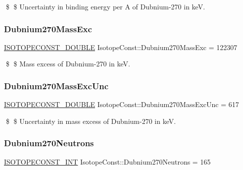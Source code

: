 \$ \$ Uncertainty in binding energy per A of Dubnium-\/270 in keV. \mbox{\label{group___isotope_const-_dubnium-_db270_gae0d63cac9554bf97ac8a30cd10a96adf}} 
\subsubsection{\texorpdfstring{Dubnium270\+Mass\+Exc}{Dubnium270MassExc}}
{\footnotesize\ttfamily \mbox{\hyperlink{group___isotope_const-_macros_ga8f45a7272ce02c0b4c65c44636ed719a}{I\+S\+O\+T\+O\+P\+E\+C\+O\+N\+S\+T\+\_\+\+D\+O\+U\+B\+LE}} Isotope\+Const\+::\+Dubnium270\+Mass\+Exc = 122307}

\$ \$ Mass excess of Dubnium-\/270 in keV. \mbox{\label{group___isotope_const-_dubnium-_db270_ga33030844d8b7a857f79835004a226f11}} 
\subsubsection{\texorpdfstring{Dubnium270\+Mass\+Exc\+Unc}{Dubnium270MassExcUnc}}
{\footnotesize\ttfamily \mbox{\hyperlink{group___isotope_const-_macros_ga8f45a7272ce02c0b4c65c44636ed719a}{I\+S\+O\+T\+O\+P\+E\+C\+O\+N\+S\+T\+\_\+\+D\+O\+U\+B\+LE}} Isotope\+Const\+::\+Dubnium270\+Mass\+Exc\+Unc = 617}

\$ \$ Uncertainty in mass excess of Dubnium-\/270 in keV. \mbox{\label{group___isotope_const-_dubnium-_db270_gacf3bfa02f058b3a459cc2c9e994ee283}} 
\subsubsection{\texorpdfstring{Dubnium270\+Neutrons}{Dubnium270Neutrons}}
{\footnotesize\ttfamily \mbox{\hyperlink{group___isotope_const-_macros_ga5f18360b3e99483a35c32d789e62621c}{I\+S\+O\+T\+O\+P\+E\+C\+O\+N\+S\+T\+\_\+\+I\+NT}} Isotope\+Const\+::\+Dubnium270\+Neutrons = 165}

